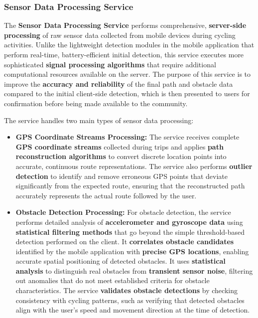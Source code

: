 \subsubsection{Sensor Data Processing Service}
The \textbf{Sensor Data Processing Service} performs comprehensive, \textbf{server-side processing} of raw sensor data collected from mobile devices during cycling activities. Unlike the lightweight detection modules in the mobile application that perform real-time, battery-efficient initial detection, this service executes more sophisticated \textbf{signal processing algorithms} that require additional computational resources available on the server. The purpose of this service is to improve the \textbf{accuracy and reliability} of the final path and obstacle data compared to the initial client-side detection, which is then presented to users for confirmation before being made available to the community.

The service handles two main types of sensor data processing:

\begin{itemize}
    \item \textbf{GPS Coordinate Streams Processing:} The service receives complete \textbf{GPS coordinate streams} collected during trips and applies \textbf{path reconstruction algorithms} to convert discrete location points into accurate, continuous route representations. The service also performs \textbf{outlier detection} to identify and remove erroneous GPS points that deviate significantly from the expected route, ensuring that the reconstructed path accurately represents the actual route followed by the user.
    \item \textbf{Obstacle Detection Processing:} For obstacle detection, the service performs detailed analysis of \textbf{accelerometer and gyroscope data} using \textbf{statistical filtering methods} that go beyond the simple threshold-based detection performed on the client. It \textbf{correlates obstacle candidates} identified by the mobile application with \textbf{precise GPS locations}, enabling accurate spatial positioning of detected obstacles. It uses \textbf{statistical analysis} to distinguish real obstacles from \textbf{transient sensor noise}, filtering out anomalies that do not meet established criteria for obstacle characteristics. The service \textbf{validates obstacle detections} by checking consistency with cycling patterns, such as verifying that detected obstacles align with the user's speed and movement direction at the time of detection.
\end{itemize}

